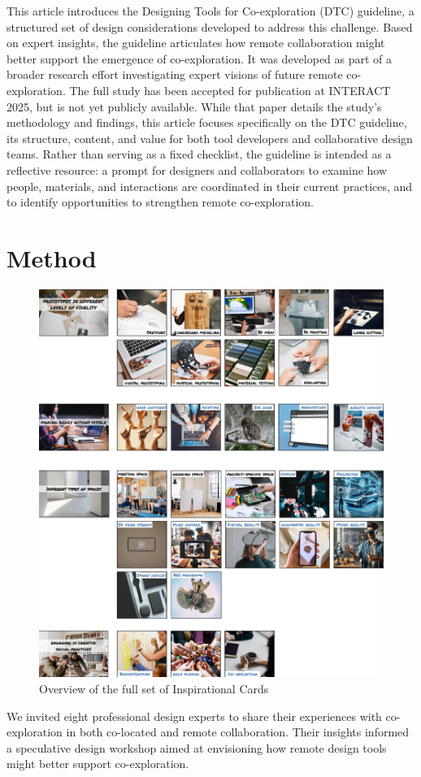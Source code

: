\documentclass[11pt]{article}
\begin{document}
This article introduces the Designing Tools for Co-exploration (DTC) guideline, a structured set of design considerations developed to address this challenge. Based on expert insights, the guideline articulates how remote collaboration might better support the emergence of co-exploration. It was developed as part of a broader research effort investigating expert visions of future remote co-exploration. The full study has been accepted for publication at INTERACT 2025, but is not yet publicly available. While that paper details the study's methodology and findings, this article focuses specifically on the DTC guideline, its structure, content, and value for both tool developers and collaborative design teams. Rather than serving as a fixed checklist, the guideline is intended as a reflective resource: a prompt for designers and collaborators to examine how people, materials, and interactions are coordinated in their current practices, and to identify opportunities to strengthen remote co-exploration.

\section{Method}
\begin{figure}[h]
    \centering
    \includegraphics[width=0.7\linewidth]{figures/inspirational_cards.jpg}
    \caption{Overview of the full set of Inspirational Cards}
    \label{fig: inspirational cards}
\end{figure}

\noindent We invited eight professional design experts to share their experiences with co-exploration in both co-located and remote collaboration. Their insights informed a speculative design workshop aimed at envisioning how remote design tools might better support co-exploration.
\end{document}
